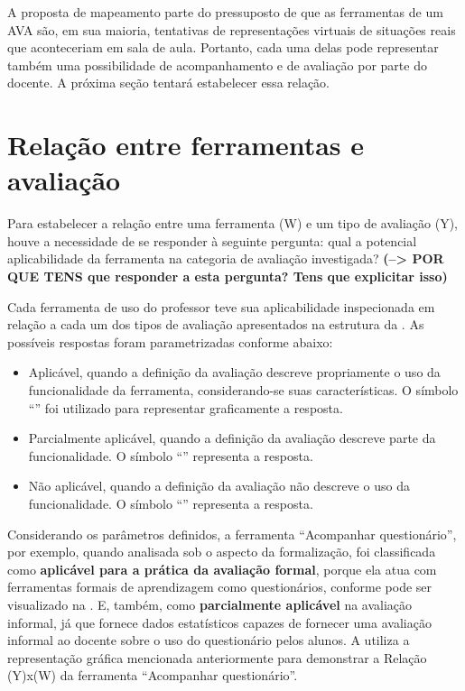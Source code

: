 A proposta de mapeamento parte do pressuposto de que as ferramentas de um AVA são, em sua maioria, tentativas de representações virtuais de situações reais que aconteceriam em sala de aula. Portanto, cada uma delas pode representar também uma possibilidade de acompanhamento e de avaliação por parte do docente. A próxima seção tentará estabelecer essa relação.  

\section{Relação entre ferramentas e avaliação}

Para estabelecer a relação entre uma ferramenta (W) e um tipo de avaliação (Y), houve a necessidade de se responder à seguinte pergunta: qual a potencial aplicabilidade da ferramenta na categoria de avaliação investigada? \textbf{(--> POR QUE TENS que responder a esta pergunta? Tens que explicitar isso)}

Cada ferramenta de uso do professor teve sua aplicabilidade inspecionada em relação a cada um dos tipos de avaliação apresentados na estrutura da . As possíveis respostas foram parametrizadas conforme abaixo:

\begin{itemize}
    \item Aplicável, quando a definição da avaliação descreve propriamente o uso da funcionalidade da ferramenta, considerando-se suas características. O símbolo ``'' foi utilizado para representar graficamente a resposta.
    \item Parcialmente aplicável, quando a definição da avaliação descreve parte da funcionalidade. O símbolo ``'' representa a resposta. \item Não aplicável, quando a definição da avaliação não descreve o uso da funcionalidade. O símbolo ``'' representa a resposta. 
\end{itemize}

Considerando os parâmetros definidos, a ferramenta ``Acompanhar questionário'', por exemplo, quando analisada sob o aspecto da formalização, foi classificada como \textbf{aplicável para a prática da avaliação formal}, porque ela atua com ferramentas formais de aprendizagem como questionários, conforme pode ser visualizado na . E, também, como \textbf{parcialmente aplicável} na avaliação informal, já que fornece dados estatísticos capazes de fornecer uma avaliação informal ao docente sobre o uso do questionário pelos alunos. A  utiliza a representação gráfica mencionada anteriormente para demonstrar a Relação (Y)x(W) da ferramenta ``Acompanhar questionário''.

